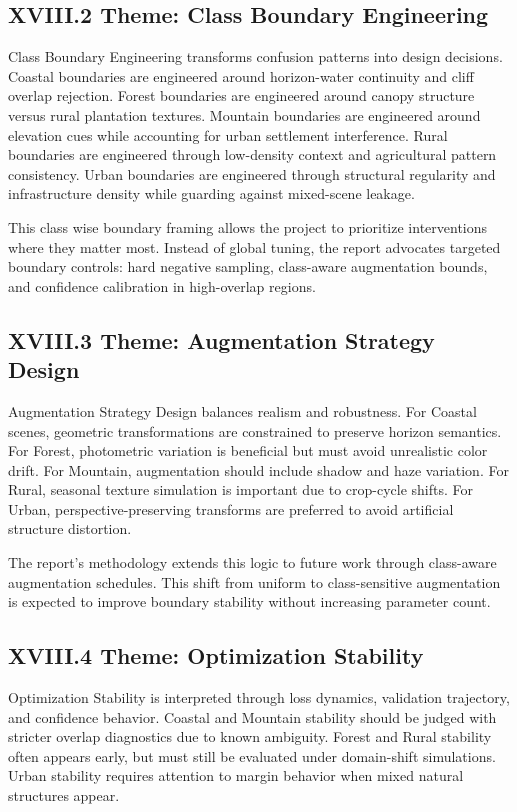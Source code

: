\subsection*{XVIII.2 Theme: Class Boundary Engineering}
Class Boundary Engineering transforms confusion patterns into design decisions. Coastal boundaries are engineered around horizon-water continuity and cliff overlap rejection. Forest boundaries are engineered around canopy structure versus rural plantation textures. Mountain boundaries are engineered around elevation cues while accounting for urban settlement interference. Rural boundaries are engineered through low-density context and agricultural pattern consistency. Urban boundaries are engineered through structural regularity and infrastructure density while guarding against mixed-scene leakage.

This class wise boundary framing allows the project to prioritize interventions where they matter most. Instead of global tuning, the report advocates targeted boundary controls: hard negative sampling, class-aware augmentation bounds, and confidence calibration in high-overlap regions.

\subsection*{XVIII.3 Theme: Augmentation Strategy Design}
Augmentation Strategy Design balances realism and robustness. For Coastal scenes, geometric transformations are constrained to preserve horizon semantics. For Forest, photometric variation is beneficial but must avoid unrealistic color drift. For Mountain, augmentation should include shadow and haze variation. For Rural, seasonal texture simulation is important due to crop-cycle shifts. For Urban, perspective-preserving transforms are preferred to avoid artificial structure distortion.

The report's methodology extends this logic to future work through class-aware augmentation schedules. This shift from uniform to class-sensitive augmentation is expected to improve boundary stability without increasing parameter count.

\subsection*{XVIII.4 Theme: Optimization Stability}
Optimization Stability is interpreted through loss dynamics, validation trajectory, and confidence behavior. Coastal and Mountain stability should be judged with stricter overlap diagnostics due to known ambiguity. Forest and Rural stability often appears early, but must still be evaluated under domain-shift simulations. Urban stability requires attention to margin behavior when mixed natural structures appear.

